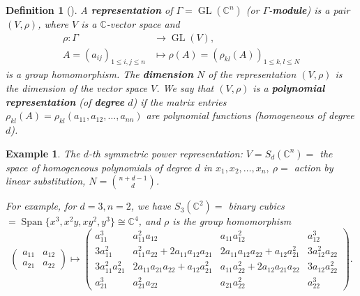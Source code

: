 \documentclass{article}
\newtheorem{defn}[theorem]{Definition\rm}
\newtheorem{example}{Example}
\newcommand{\lra}{\longrightarrow}
\newcommand{\CC}{\mathbb{C}}
\newcommand{\pbrackets}[1]{\left( #1 \right)}
\DeclareMathOperator{\Span}{Span}
\DeclareMathOperator{\GL}{GL}
\begin{document}
		\begin{defn}[\cite{Sturmfels2008}]
		A \textbf{representation} of $\Gamma = \GL(\CC^{n})$ (or $\Gamma$-\textbf{module}) is a pair $(V, \rho)$, where $V$ is a $\CC$-vector space and
		\begin{equation*}
			\begin{split}
				\rho : \Gamma &\lra \GL(V), \\
				A = (a_{ij})_{1 \leq i,j \leq n} &\longmapsto \rho(A) = \pbrackets{\rho_{kl}(A)}_{1 \leq k, l \leq N}
			\end{split}
		\end{equation*}
		is a group homomorphism. The \textbf{dimension} $N$ of the representation $(V, \rho)$ is the dimension of the vector space $V$. We say that $(V, \rho)$ is a \textbf{polynomial representation} (of \textbf{degree} $d$) if the matrix entries $\rho_{kl}(A) = \rho_{kl}(a_{11}, a_{12}, \ldots, a_{nn})$ are polynomial functions (homogeneous of degree $d$).
	\end{defn}
	
	\begin{example}
		The $d$-th symmetric power representation: $V = S_{d}(\CC^{n}) =$ the space of homogeneous polynomials of degree $d$ in $x_{1}, x_{2}, \ldots, x_{n},\ \rho =$ action by linear substitution, $N = \binom{n + d -1}{d}$.
		
		For example, for $d = 3, n = 2$, we have $S_{3}(\CC^{2}) =$ binary cubics $=\Span\{x^{3}, x^{2}y, xy^{2}, y^{3}\} \cong \CC^{4}$, and $\rho$ is the group homomorphism
		\begin{equation*}
			\begin{pmatrix}
				a_{11} & a_{12} \\ 
				a_{21} & a_{22}
			\end{pmatrix}
			\mapsto
			\begin{pmatrix}
				a_{11}^{3} & a_{11}^{2}a_{12} & a_{11}a_{12}^{2} & a_{12}^{3} \\
				3a_{11}^{2} & a_{11}^{2}a_{22} + 2a_{11}a_{12}a_{21} & 2a_{11}a_{12}a_{22} + a_{12}a_{21}^{2} & 3a_{12}^{2}a_{22} \\ 
				3a_{11}^{2}a_{21}^{2} & 2a_{11}a_{21}a_{22} + a_{12}a_{21}^{2} & a_{11}a_{22}^{2} + 2a_{12}a_{21}a_{22} & 3a_{12}a_{22}^{2} \\ 
				a_{21}^{3} & a_{21}^{2}a_{22} & a_{21}a_{22}^{2} & a_{22}^{3}
			\end{pmatrix}.
		\end{equation*}
	\end{example}
	
\end{document}
